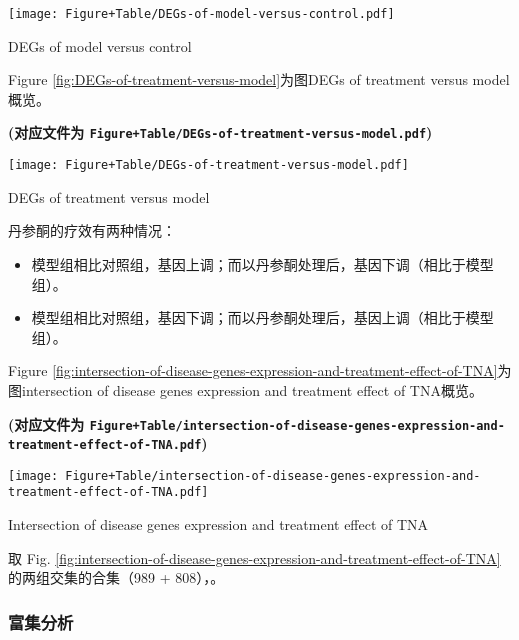 \documentclass[
]{article}
\providecommand{\tightlist}{%
  \setlength{\itemsep}{0pt}\setlength{\parskip}{0pt}}
\begin{document}
\def\@captype{figure}
\begin{center}
\texttt{[image: Figure+Table/DEGs-of-model-versus-control.pdf]}
\caption{DEGs of model versus control}\label{fig:DEGs-of-model-versus-control}
\end{center}

Figure \ref{fig:DEGs-of-treatment-versus-model}为图DEGs of treatment versus model概览。

\textbf{(对应文件为 \texttt{Figure+Table/DEGs-of-treatment-versus-model.pdf})}

\def\@captype{figure}
\begin{center}
\texttt{[image: Figure+Table/DEGs-of-treatment-versus-model.pdf]}
\caption{DEGs of treatment versus model}\label{fig:DEGs-of-treatment-versus-model}
\end{center}

丹参酮的疗效有两种情况：

\begin{itemize}
\tightlist
\item
  模型组相比对照组，基因上调；而以丹参酮处理后，基因下调（相比于模型组）。
\item
  模型组相比对照组，基因下调；而以丹参酮处理后，基因上调（相比于模型组）。
\end{itemize}

Figure \ref{fig:intersection-of-disease-genes-expression-and-treatment-effect-of-TNA}为图intersection of disease genes expression and treatment effect of TNA概览。

\textbf{(对应文件为 \texttt{Figure+Table/intersection-of-disease-genes-expression-and-treatment-effect-of-TNA.pdf})}

\def\@captype{figure}
\begin{center}
\texttt{[image: Figure+Table/intersection-of-disease-genes-expression-and-treatment-effect-of-TNA.pdf]}
\caption{Intersection of disease genes expression and treatment effect of TNA}\label{fig:intersection-of-disease-genes-expression-and-treatment-effect-of-TNA}
\end{center}

取 Fig. \ref{fig:intersection-of-disease-genes-expression-and-treatment-effect-of-TNA} 的两组交集的合集（989 + 808），。

\hypertarget{ux5bccux96c6ux5206ux6790}{%
\subsubsection{富集分析}\label{ux5bccux96c6ux5206ux6790}}
\end{document}
